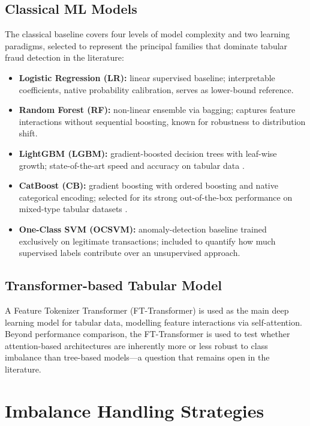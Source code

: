 \subsection{Classical ML Models}
The classical baseline covers four levels of model complexity and two learning paradigms, selected to represent the principal families that dominate tabular fraud detection in the literature:
\begin{itemize}
  \item \textbf{Logistic Regression (LR):} linear supervised baseline; interpretable coefficients, native probability calibration, serves as lower-bound reference.
  \item \textbf{Random Forest (RF):} non-linear ensemble via bagging; captures feature interactions without sequential boosting, known for robustness to distribution shift.
  \item \textbf{LightGBM (LGBM):} gradient-boosted decision trees with leaf-wise growth; state-of-the-art speed and accuracy on tabular data \cite{ke2017lightgbm}.
  \item \textbf{CatBoost (CB):} gradient boosting with ordered boosting and native categorical encoding; selected for its strong out-of-the-box performance on mixed-type tabular datasets \cite{prokhorenkova2018catboost}.
  \item \textbf{One-Class SVM (OCSVM):} anomaly-detection baseline trained exclusively on legitimate transactions; included to quantify how much supervised labels contribute over an unsupervised approach.
\end{itemize}

\subsection{Transformer-based Tabular Model}
A Feature Tokenizer Transformer (FT-Transformer) is used as the main deep learning model for tabular data, modelling feature interactions via self-attention. Beyond performance comparison, the FT-Transformer is used to test whether attention-based architectures are inherently more or less robust to class imbalance than tree-based models---a question that remains open in the literature.

\section{Imbalance Handling Strategies}
\label{sec:imbalance_strategies}

